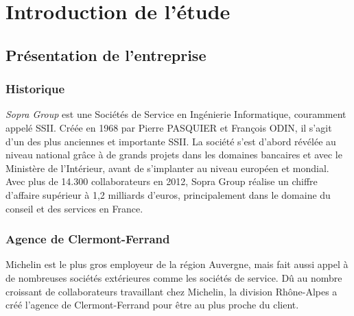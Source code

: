 \cleardoublepage

\chapter{Introduction de l'étude}


\section{Présentation de l'entreprise}


\subsection{Historique}

\textit{Sopra Group} est une Sociétés de Service en Ingénierie Informatique, couramment appelé SSII.
Créée en 1968 par Pierre PASQUIER et François ODIN, il s'agit d'un des plus anciennes et importante SSII.
La société s'est d'abord révélée au niveau national grâce à de grands projets dans les domaines bancaires et avec le Ministère de l'Intérieur, avant de s'implanter au niveau européen et mondial.
Avec plus de 14.300 collaborateurs en 2012, Sopra Group réalise un chiffre d'affaire supérieur à 1,2 milliards d'euros, principalement dans le domaine du conseil et des services en France.


\subsection{Agence de Clermont-Ferrand}

Michelin est le plus gros employeur de la région Auvergne, mais fait aussi appel à de nombreuses sociétés extérieures comme les sociétés de service.
Dû au nombre croissant de collaborateurs travaillant chez Michelin, la division Rhône-Alpes a créé l'agence de Clermont-Ferrand pour être au plus proche du client.

